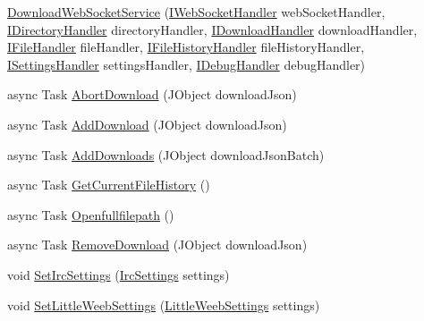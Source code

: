 \begin{DoxyCompactItemize}
\item 
\mbox{\hyperlink{class_little_weeb_library_1_1_services_1_1_download_web_socket_service_a33a4c5640800b885662c686013c02971}{Download\+Web\+Socket\+Service}} (\mbox{\hyperlink{interface_little_weeb_library_1_1_handlers_1_1_i_web_socket_handler}{I\+Web\+Socket\+Handler}} web\+Socket\+Handler, \mbox{\hyperlink{interface_little_weeb_library_1_1_handlers_1_1_i_directory_handler}{I\+Directory\+Handler}} directory\+Handler, \mbox{\hyperlink{interface_little_weeb_library_1_1_handlers_1_1_i_download_handler}{I\+Download\+Handler}} download\+Handler, \mbox{\hyperlink{interface_little_weeb_library_1_1_handlers_1_1_i_file_handler}{I\+File\+Handler}} file\+Handler, \mbox{\hyperlink{interface_little_weeb_library_1_1_handlers_1_1_i_file_history_handler}{I\+File\+History\+Handler}} file\+History\+Handler, \mbox{\hyperlink{interface_little_weeb_library_1_1_handlers_1_1_i_settings_handler}{I\+Settings\+Handler}} settings\+Handler, \mbox{\hyperlink{interface_little_weeb_library_1_1_handlers_1_1_i_debug_handler}{I\+Debug\+Handler}} debug\+Handler)
\item 
async Task \mbox{\hyperlink{class_little_weeb_library_1_1_services_1_1_download_web_socket_service_a0ab2f2e6fcb90cd42dfa0de9d6a58f7e}{Abort\+Download}} (J\+Object download\+Json)
\item 
async Task \mbox{\hyperlink{class_little_weeb_library_1_1_services_1_1_download_web_socket_service_a7aaa1db63ee81a2e5246e45ef8643087}{Add\+Download}} (J\+Object download\+Json)
\item 
async Task \mbox{\hyperlink{class_little_weeb_library_1_1_services_1_1_download_web_socket_service_ad6afd5ee42650d16c67790c6d2ac80c1}{Add\+Downloads}} (J\+Object download\+Json\+Batch)
\item 
async Task \mbox{\hyperlink{class_little_weeb_library_1_1_services_1_1_download_web_socket_service_adb3b1a3aadf9ad491388890e432f6c91}{Get\+Current\+File\+History}} ()
\item 
async Task \mbox{\hyperlink{class_little_weeb_library_1_1_services_1_1_download_web_socket_service_a6f2201dd7b86f142c2e901262ea53fbe}{Openfullfilepath}} ()
\item 
async Task \mbox{\hyperlink{class_little_weeb_library_1_1_services_1_1_download_web_socket_service_a3bc6b4176561f56b918e75527c7698d0}{Remove\+Download}} (J\+Object download\+Json)
\item 
void \mbox{\hyperlink{class_little_weeb_library_1_1_services_1_1_download_web_socket_service_ac692e2804ac253cc2ceac79d88a2e191}{Set\+Irc\+Settings}} (\mbox{\hyperlink{class_little_weeb_library_1_1_settings_1_1_irc_settings}{Irc\+Settings}} settings)
\item 
void \mbox{\hyperlink{class_little_weeb_library_1_1_services_1_1_download_web_socket_service_a4b1d1eda437419a534bb4ee17ed26d4f}{Set\+Little\+Weeb\+Settings}} (\mbox{\hyperlink{class_little_weeb_library_1_1_settings_1_1_little_weeb_settings}{Little\+Weeb\+Settings}} settings)
\end{DoxyCompactItemize}
